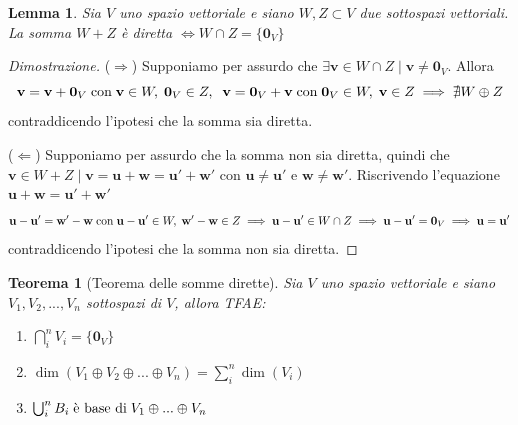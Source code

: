 \documentclass{article}
\newtheorem{theorem}{Teorema}
\newtheorem{lemma}{Lemma}
\begin{document}
    \vspace{10pt}
    \begin{lemma}
        Sia $V$ uno spazio vettoriale e siano $W, Z \subset V$ due sottospazi vettoriali. La somma $W + Z$ è diretta $\iff W \cap Z = \{\mathbf{0}_V\}$
    \end{lemma}
    \begin{proof}[Dimostrazione]
        ($\Rightarrow$)
        Supponiamo per assurdo che $\exists \mathbf{v} \in W \cap Z \; | \; \mathbf{v} \neq \mathbf{0}_V$. Allora 
        \[
            \mathbf{v} = \mathbf{v} + \mathbf{0}_V \; \textnormal{con} \; \mathbf{v} \in W, \; \mathbf{0}_V \in Z, \;\; \mathbf{v} = \mathbf{0}_V + \mathbf{v} \; \textnormal{con} \; \mathbf{0}_V \in W, \; \mathbf{v} \in Z \implies \nexists W \oplus Z 
        \]
        contraddicendo l'ipotesi che la somma sia diretta.

        \vspace{5pt}
        ($\Leftarrow$) 
        Supponiamo per assurdo che la somma non sia diretta, quindi che $\mathbf{v} \in W + Z \; | \; \mathbf{v} = \mathbf{u} + \mathbf{w} = \mathbf{u'} + \mathbf{w'}$ con $\mathbf{u} \neq \mathbf{u'}$ e $\mathbf{w} \neq \mathbf{w'}$. Riscrivendo l'equazione $\mathbf{u} + \mathbf{w} = \mathbf{u'} + \mathbf{w'}$ 
        \[
            \mathbf{u} - \mathbf{u'} = \mathbf{w'} - \mathbf{w} \; \textnormal{con} \; \mathbf{u} - \mathbf{u'} \in W, \; \mathbf{w'} - \mathbf{w} \in Z \implies \mathbf{u} - \mathbf{u'} \in W \cap Z \implies \mathbf{u} - \mathbf{u'} = \mathbf{0}_V \implies \mathbf{u} = \mathbf{u'}
        \]
        contraddicendo l'ipotesi che la somma non sia diretta.
    \end{proof}

    \vspace{10pt}
    \begin{theorem}[Teorema delle somme dirette]
        Sia $V$ uno spazio vettoriale e siano $V_1, V_2, ..., V_n$ sottospazi di $V$, allora TFAE: 
        \begin{enumerate}[label=(\Roman*)]
            \item $\bigcap_{i}^{n} V_i = \{\mathbf{0}_V\}$ 
            \item $\dim(V_1 \oplus V_2 \oplus ... \oplus V_n) =  \sum_{i}^{n} \dim(V_i)$
            \item $\bigcup_{i}^{n} B_i \; \textnormal{è base di} \; V_1 \oplus ... \oplus V_n$
        \end{enumerate}
    \end{theorem}
\end{document}
